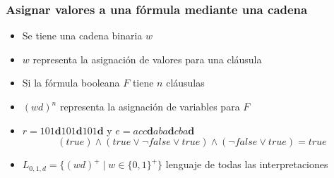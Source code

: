 \documentclass{beamer}
\begin{document}
\begin{frame}
    \frametitle{Asignar valores a una fórmula mediante una cadena}
    
    \begin{itemize}
        \item Se tiene una cadena binaria $w$
              \pause
        \item $w$ representa la asignación de valores para una cláusula
              \pause
        \item Si la fórmula booleana $F$ tiene $n$ cláusulas
              \pause
        \item $(wd)^n$ representa la asignación de variables para $F$
              \pause
        \item $r=101\mathbf{d}101\mathbf{d}101\mathbf{d}$ y $e= acc\mathbf{d}aba\mathbf{d}cba\mathbf{d}$
              $$(true)\wedge(true\vee \neg false \vee true) \wedge (\neg false\vee true)=true$$
              \pause
        \item $L_{0,1,d}=\{(wd)^+\mid w\in\{0,1\}^+\}$ lenguaje de todas las interpretaciones
    \end{itemize}
\end{frame}
\end{document}
